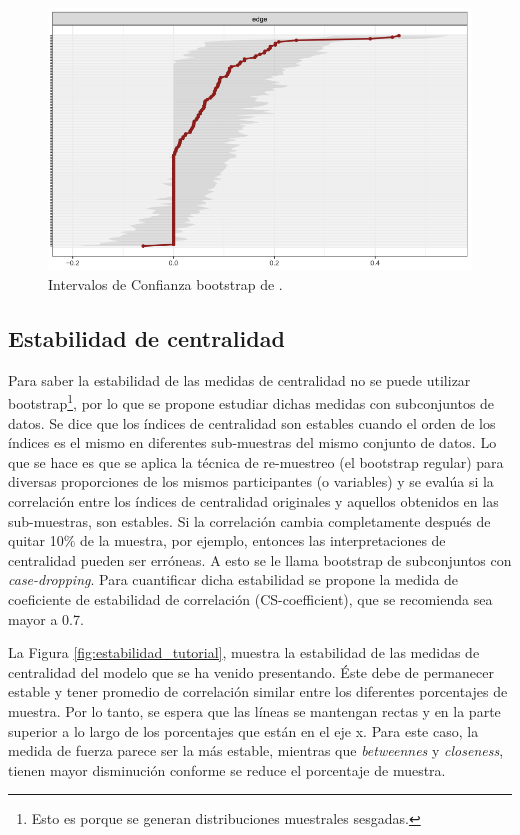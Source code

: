 \documentclass[11pt,spanish]{article}\usepackage[]{graphicx}\usepackage[]{color}
\begin{document}
\begin{figure}[!ht]
\centering
\includegraphics[scale=0.5]{images/intervalos_boot_tutorial}
\caption{Intervalos de Confianza bootstrap de \cite{main_tutorial}.}
\label{fig:inter_boot_tutorial}
\end{figure}

\subsection{Estabilidad de centralidad}

Para saber la estabilidad de las medidas de centralidad no se puede utilizar bootstrap\footnote{Esto es porque se generan distribuciones muestrales sesgadas.}, por lo que se propone estudiar dichas medidas con subconjuntos de datos. Se dice que los índices de centralidad son estables cuando el orden de los índices es el mismo en diferentes sub-muestras del mismo conjunto de datos. Lo que se hace es que se aplica la técnica de re-muestreo (el bootstrap regular) para diversas proporciones de los mismos participantes (o variables) y se evalúa si la correlación entre los índices de centralidad originales y aquellos obtenidos en las sub-muestras, son estables. Si la correlación cambia completamente después de quitar 10\% de la muestra, por ejemplo, entonces las interpretaciones de centralidad pueden ser erróneas. A esto se le llama bootstrap de subconjuntos con \emph{case-dropping}. Para cuantificar dicha estabilidad se propone la medida de coeficiente de estabilidad de correlación (CS-coefficient), que se recomienda sea mayor a 0.7.


La Figura \ref{fig:estabilidad_tutorial}, muestra la estabilidad de las medidas de centralidad del modelo que se ha venido presentando. Éste debe de permanecer estable y tener promedio de correlación similar entre los diferentes porcentajes de muestra. Por lo tanto, se espera que las líneas se mantengan rectas y en la parte superior a lo largo de los porcentajes que están en el eje x. Para este caso, la medida de fuerza parece ser la más estable, mientras que \emph{betweennes} y \emph{closeness}, tienen mayor disminución conforme se reduce el porcentaje de muestra. 
\end{document}
